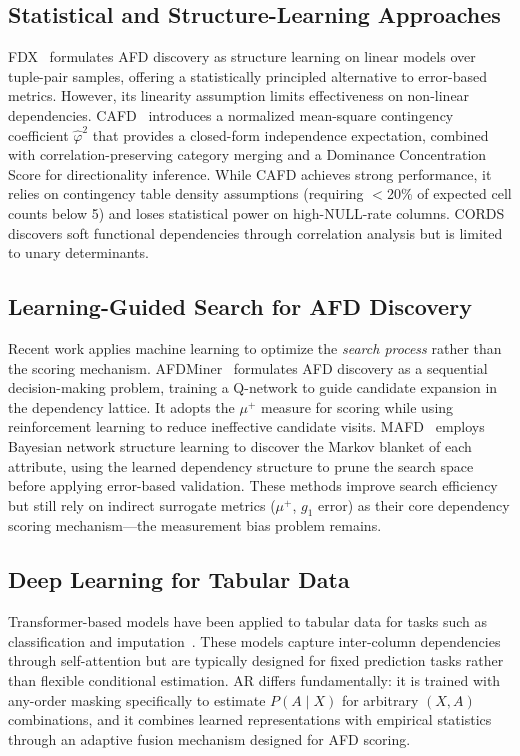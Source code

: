 \documentclass[conference]{IEEEtran}
\begin{document}
\subsection{Statistical and Structure-Learning Approaches}
FDX~\cite{fdx} formulates AFD discovery as structure learning on linear models over tuple-pair samples, offering a statistically principled alternative to error-based metrics. However, its linearity assumption limits effectiveness on non-linear dependencies. CAFD~\cite{cafdui} introduces a normalized mean-square contingency coefficient $\hat{\varphi}^2$ that provides a closed-form independence expectation, combined with correlation-preserving category merging and a Dominance Concentration Score for directionality inference. While CAFD achieves strong performance, it relies on contingency table density assumptions (requiring $<$20\% of expected cell counts below 5) and loses statistical power on high-NULL-rate columns. CORDS~\cite{cords} discovers soft functional dependencies through correlation analysis but is limited to unary determinants.

\subsection{Learning-Guided Search for AFD Discovery}
Recent work applies machine learning to optimize the \emph{search process} rather than the scoring mechanism. AFDMiner~\cite{afdminer} formulates AFD discovery as a sequential decision-making problem, training a Q-network to guide candidate expansion in the dependency lattice. It adopts the $\mu^+$ measure for scoring while using reinforcement learning to reduce ineffective candidate visits. MAFD~\cite{mafd} employs Bayesian network structure learning to discover the Markov blanket of each attribute, using the learned dependency structure to prune the search space before applying error-based validation. These methods improve search efficiency but still rely on indirect surrogate metrics ($\mu^+$, $g_1$ error) as their core dependency scoring mechanism---the measurement bias problem remains.

\subsection{Deep Learning for Tabular Data}
Transformer-based models have been applied to tabular data for tasks such as classification and imputation~\cite{tabnet,tabtransformer}. These models capture inter-column dependencies through self-attention but are typically designed for fixed prediction tasks rather than flexible conditional estimation. AR differs fundamentally: it is trained with any-order masking specifically to estimate $P(A \mid X)$ for arbitrary $(X, A)$ combinations, and it combines learned representations with empirical statistics through an adaptive fusion mechanism designed for AFD scoring.
\end{document}

